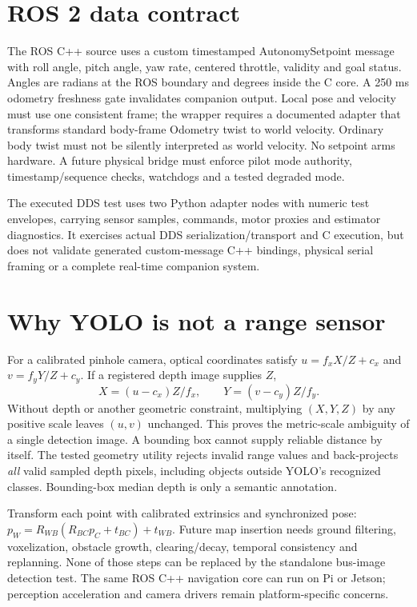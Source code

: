 \section{ROS 2 data contract}
The ROS C++ source uses a custom timestamped AutonomySetpoint message with
roll angle, pitch angle, yaw rate, centered throttle, validity and goal status.
Angles are radians at the ROS boundary and degrees inside the C core. A
250 ms odometry freshness gate invalidates companion output. Local pose and
velocity must use one consistent frame; the wrapper requires a documented
adapter that transforms standard body-frame Odometry twist to world velocity.
Ordinary body twist must not be silently interpreted as world velocity.
No setpoint arms hardware. A future physical bridge must enforce pilot mode
authority, timestamp/sequence checks, watchdogs and a tested degraded mode.

The executed DDS test uses two Python adapter nodes with numeric test
envelopes, carrying sensor samples, commands, motor proxies and estimator
diagnostics. It exercises actual DDS serialization/transport and C execution,
but does not validate generated custom-message C++ bindings, physical serial
framing or a complete real-time companion system.

\section{Why YOLO is not a range sensor}
For a calibrated pinhole camera, optical coordinates satisfy
$u=f_xX/Z+c_x$ and $v=f_yY/Z+c_y$. If a registered depth image supplies $Z$,
\begin{equation}
X=(u-c_x)Z/f_x,\qquad Y=(v-c_y)Z/f_y.
\end{equation}
Without depth or another geometric constraint, multiplying $(X,Y,Z)$ by any
positive scale leaves $(u,v)$ unchanged. This proves the metric-scale
ambiguity of a single detection image. A bounding box cannot supply reliable
distance by itself. The tested geometry utility rejects invalid range values
and back-projects \emph{all} valid sampled depth pixels, including objects
outside YOLO's recognized classes. Bounding-box median depth is only a
semantic annotation.

Transform each point with calibrated extrinsics and synchronized pose:
$p_W=R_{WB}(R_{BC}p_C+t_{BC})+t_{WB}$. Future map insertion needs ground
filtering, voxelization, obstacle growth, clearing/decay, temporal consistency
and replanning. None of those steps can be replaced by the standalone bus-image
detection test. The same ROS C++ navigation core can run on Pi or Jetson;
perception acceleration and camera drivers remain platform-specific concerns.

